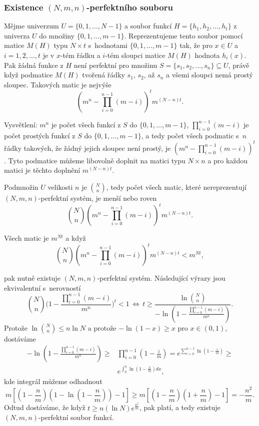 \documentclass[a4paper,12pt]{article}
\begin{document}
\subsubsection{Existence $(N,m,n)$-perfektního souboru}

Mějme univerzum $U=\{0,1,\dots,N-1\}$ a soubor 
funkcí $H=\{h_1,h_2,\dots,h_t\}$ z univerza $U$ do množiny 
$\{0,1,\dots,m-1\}$.  Reprezentujeme tento soubor pomocí 
matice $M(H)$ typu $N\times t$ s~hodnotami $\{0,1,\dots,m-1\}$ tak, 
že pro $x\in U$ a $i=1,2,\dots,t$ je 
v $x$-tém řádku a $i$-tém sloupci matice $M(H)$ 
hodnota $h_i(x)$. Pak žádná funkce z $H$ 
není perfektní pro množinu $S=\{s_1,s_2,\dots,s_n\}\subseteq 
U$, 
právě když podmatice $M(H)$ tvoře\-ná 
řádky $s_1$, $s_2$, až $s_n$ a všemi sloupci nemá prostý sloupec. 
Ta\-ko\-vých matic je nejvýše 
$$(m^n-\prod_{i=0}^{n-1}(m-i))^tm^{(N-n)t}.$$

Vysvětlení:  $m^n$ je počet všech funkcí z $
S$ do 
$\{0,1,\dots,m-1\}$, $\prod_{i=0}^{n-1}(m-i)$ je počet prostých funkcí z $
S$ 
do $\{0,1,\dots,m-1\}$, a tedy počet všech podmatic s~$n$ 
řádky takových, že žádný jejich sloupec není prostý, je 
$(m^n-\prod_{i=0}^{n-1}(m-i))^t$.  Tyto podmatice můžeme 
libovolně doplnit na matici typu $N\times n$ a pro každou 
matici je těchto doplnění $m^{(N-n)t}$.  

Podmnožin $U$ velikosti $n$ je $\binom Nn$, tedy počet všech 
matic, které nereprezentují $(N,m,n)$-perfektní systém, je 
menší nebo roven  
$$\binom Nn(m^n-\prod_{i=0}^{n-1}(m-i))^tm^{(N-n)t}.$$

Všech matic je $m^{Nt}$ a když 
\begin{equation*}\tag{\*}\binom Nn(m^n-\prod_{i=0}^{n-1}(m-i))^tm^{(N-n)t}<m^{Nt},\end{equation*}

pak nutně existuje $(N,m,n)$-perfektní systém. 
Následující vý\-ra\-zy jsou ekvivalentní s~ne\-rov\-ností 
\thetag{$*$}
$$\binom Nn\big(1-\frac {\prod_{i=0}^{n-1}(m-i)}{m^n}\big)^t<1\,\Leftrightarrow\,
t\ge\frac {\ln\binom Nn}{-\ln(1-\frac {\prod_{i=0}^{n-1}(m-i)}{m^
n})}.$$
Protože $\ln\binom Nn\le n\ln N$ a protože $-\ln(1-x)\ge x$ pro $
x\in (0,1)$, dostáváme
\begin{align*}-\ln(1-\frac {\prod_{i=0}^{n-1}(m-i)}{m^n})\ge&\prod_{i=0}^{
n-1}(1-\frac im)=e^{\sum_{i=0}^{n-1}\ln(1-\frac im)}\ge\\
&e^{\int_0^n\ln(1-\frac xm)dx},\end{align*}
kde integrál můžeme odhadnout 
$$m[(1-\frac nm)(1-\ln(1-\frac nm))-1]\ge m[(1-\frac nm)(1+\frac 
nm)-1]=-\frac {n^2}m.$$
Odtud dostáváme, že když $t\ge n(\ln N)e^{\frac {n^2}m}$, pak \thetag{*} platí, a tedy 
existuje $(N,m,n)$-perfektní soubor funkcí. 
\end{document}
